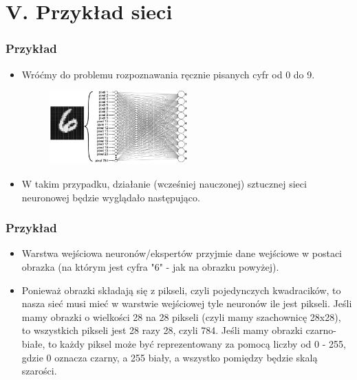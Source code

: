 \documentclass{beamer}
\begin{document}
\section{V. Przykład sieci}

\begin{frame}[fragile]
\frametitle{Przykład}
 \begin{itemize}
\item Wróćmy do problemu rozpoznawania ręcznie pisanych cyfr od 0 do 9.

                    \begin{figure}[h]
                        \centering
                        \includegraphics[width=0.5\textwidth]{../../img/mnist_1layer.png}
                    \end{figure}                    
                    \item W takim przypadku, działanie (wcześniej nauczonej) sztucznej sieci neuronowej będzie wyglądało następująco. 
\end{itemize}
\end{frame}

\begin{frame}[fragile]
\frametitle{Przykład}
\begin{itemize}
\item Warstwa wejściowa neuronów/ekspertów przyjmie dane wejściowe w postaci obrazka (na którym jest cyfra "6" - jak na obrazku powyżej).
\item Ponieważ obrazki składają się z pikseli, czyli pojedynczych kwadracików, to nasza sieć musi mieć w warstwie wejściowej tyle neuronów ile jest pikseli. Jeśli mamy obrazki o wielkości 28 na 28 pikseli (czyli mamy szachownicę 28x28), to wszystkich pikseli jest 28 razy 28, czyli 784. Jeśli mamy obrazki czarno-białe, to każdy piksel może być reprezentowany za pomocą liczby od 0 - 255, gdzie 0 oznacza czarny, a 255 biały, a wszystko pomiędzy będzie skalą szarości. 
\end{itemize}
\end{frame}
\end{document}
